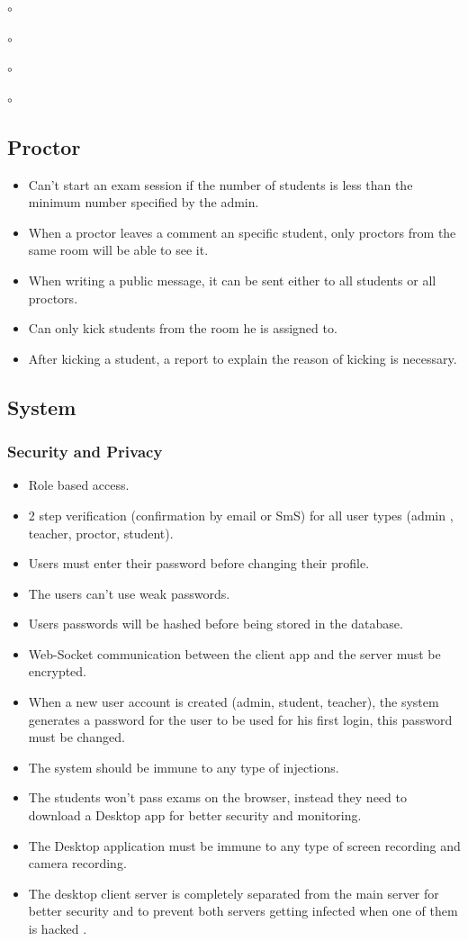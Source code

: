 \documentclass[]{uc2pfecaneva}
\begin{document}
\begin{list}{$\circ$}{}
\begin{list}{$\circ$}{}
\begin{list}{$\circ$}{}
\begin{list}{$\circ$}{}
    \raggedright\subsection{Proctor}
    \begin{itemize}
        \item Can’t start an exam session if the number of students is less than the minimum number specified by the admin.
        \item When a proctor leaves a comment an specific student, only proctors from the same room will be able to see it.
        \item When writing a public message, it can be sent either to all students or all proctors.
        \item Can only kick students from the room he is assigned to.
        \item After kicking a student, a report to explain the reason of kicking is necessary.
    \end{itemize}


    \raggedright\subsection{System}

    \raggedright\subsubsection{Security and Privacy}
    \begin{itemize}
        \item Role based access.
        \item 2 step verification (confirmation by email or SmS) for all user types (admin , teacher, proctor, student).
        \item Users must enter their password before changing their profile.
        \item The users can't use weak passwords.
        \item Users passwords will be hashed before being stored in the database.
        \item Web-Socket communication between the client app and the server must be encrypted.
        \item When a new user account is created (admin, student, teacher), the system generates a password for the user to be used for his first login, this password must be changed.
        \item The system should be immune to any type of injections.
        \item The students won’t pass exams on the browser, instead they need to download a Desktop app for better security and monitoring.
        \item The Desktop application must be immune to any type of screen recording and camera recording.
        \item The desktop client server is completely separated from the main server for better security and to prevent both servers getting infected when one of them is hacked .
    \end{itemize}


\end{list}
\end{list}
\end{list}
\end{list}
\end{document}

